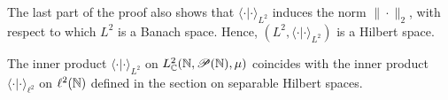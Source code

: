 The last part of the proof also shows that $\langle\cdot | \cdot \rangle_{L^2}$ induces the norm $\|\cdot\|_2$, with respect to which $L^2$ is a Banach space. Hence, $(L^2,\langle\cdot | \cdot \rangle_{L^2})$ is a Hilbert space.

\br
The inner product $\langle\cdot | \cdot \rangle_{L^2}$ on $L^2_{\mathbb{C}}(\mathbb{N},\mathscr{P}(\mathbb{N}),\mu)$ coincides with the inner product $\langle\cdot | \cdot \rangle_{\ell^2}$ on $\ell^2(\mathbb{N})$ defined in the section on separable Hilbert spaces.
\er























